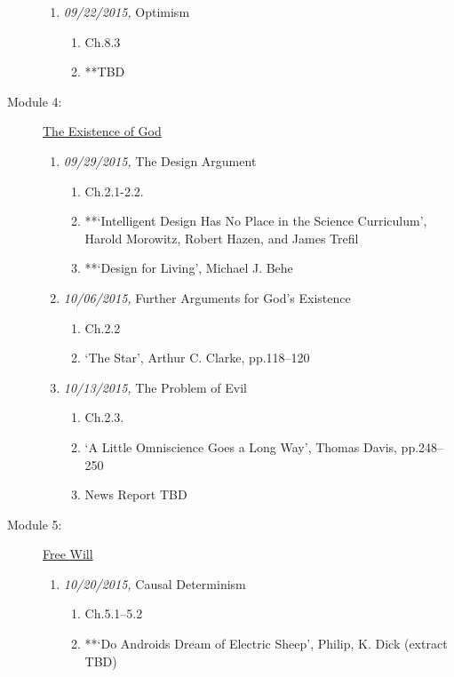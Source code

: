 \documentclass[article,oneside]{memoir}
\begin{document}
\begin{description}
\begin{enumerate}
\item \textit{09/22/2015,} Optimism
\begin{enumerate}
\item Ch.8.3
\item **TBD
\end{enumerate}
\end{enumerate}

\item[Module 4: ] \href{http://scoconno.github.io/Teaching/Examined/God/}{The Existence of God}

\begin{enumerate}

\item \textit{09/29/2015,} The Design Argument
\begin{enumerate}
\item Ch.2.1-2.2. 
\item **`Intelligent Design Has No Place in the Science Curriculum', Harold Morowitz, Robert Hazen, and James Trefil
 \item **`Design for Living', Michael J. Behe
 \end{enumerate}
 
\item \textit{10/06/2015,} Further Arguments for God's Existence
\begin{enumerate}
\item Ch.2.2
\item `The Star', Arthur C. Clarke, pp.118--120
\end{enumerate}

\item \textit{10/13/2015,} The Problem of Evil 
\begin{enumerate}
\item Ch.2.3.
\item `A Little Omniscience Goes a Long Way', Thomas Davis, pp.248--250
\item News Report TBD
\end{enumerate}
\end{enumerate}

\item[Module 5:] \href{http://scoconno.github.io/Teaching/Examined/FreeWill/}{Free Will}

\begin{enumerate}

\item \textit{10/20/2015,} Causal Determinism
\begin{enumerate}
\item Ch.5.1--5.2
\item **`Do Androids Dream of Electric Sheep', Philip, K. Dick (extract TBD)


\end{enumerate}
\end{enumerate}
\end{description}
\end{document}
